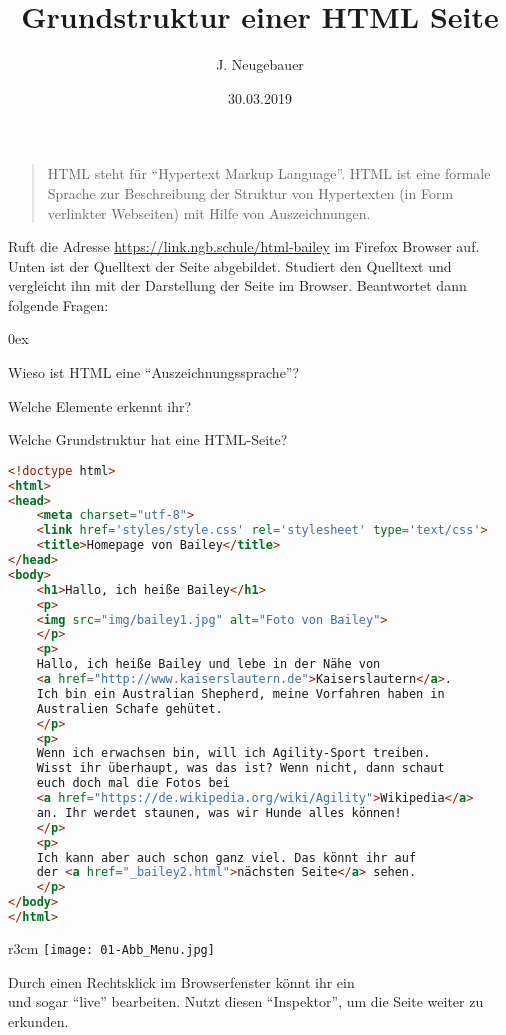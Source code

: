 \documentclass[a4paper,11pt]{scrartcl}
\author{J. Neugebauer}
\title{Grundstruktur einer HTML Seite}
\date{30.03.2019}
\begin{document}

\begin{quote}
HTML steht für \enquote{Hypertext Markup Language}. HTML ist eine formale Sprache zur Beschreibung der Struktur von Hypertexten (in Form verlinkter Webseiten) mit Hilfe von Auszeichnungen.
\end{quote}

\begin{aufgabe}[symbol=\Large\symLaptop]
Ruft die Adresse \url{https://link.ngb.schule/html-bailey} im Firefox Browser auf. Unten ist der Quelltext der Seite abgebildet. Studiert den Quelltext und vergleicht ihn mit der Darstellung der Seite im Browser. Beantwortet dann folgende Fragen:
\begin{enumeratea}\itemsep 0ex
	\item Wieso ist HTML eine \enquote{Auszeichnungssprache}?
	\item Welche Elemente erkennt ihr?
	\item Welche Grundstruktur hat eine HTML-Seite?
\end{enumeratea}
\begin{lstlisting}[language=HTML,basicstyle=\scriptsize\ttfamily]
<!doctype html>
<html>
<head>
	<meta charset="utf-8">
	<link href='styles/style.css' rel='stylesheet' type='text/css'>
	<title>Homepage von Bailey</title>
</head>
<body>
	<h1>Hallo, ich heiße Bailey</h1>
	<p>
	<img src="img/bailey1.jpg" alt="Foto von Bailey">
	</p>
	<p>
	Hallo, ich heiße Bailey und lebe in der Nähe von 
	<a href="http://www.kaiserslautern.de">Kaiserslautern</a>. 
	Ich bin ein Australian Shepherd, meine Vorfahren haben in 
	Australien Schafe gehütet.
	</p>
	<p>
	Wenn ich erwachsen bin, will ich Agility-Sport treiben. 
	Wisst ihr überhaupt, was das ist? Wenn nicht, dann schaut 
	euch doch mal die Fotos bei 
	<a href="https://de.wikipedia.org/wiki/Agility">Wikipedia</a> 
	an. Ihr werdet staunen, was wir Hunde alles können!
	</p>
	<p>
	Ich kann aber auch schon ganz viel. Das könnt ihr auf 
	der <a href="_bailey2.html">nächsten Seite</a> sehen.
	</p>
</body>
</html>
\end{lstlisting}
\end{aufgabe}

\begin{wrapfigure}{r}{3cm}
	\texttt{[image: 01-Abb\_Menu.jpg]}
\end{wrapfigure}
\begin{aufgabe}[symbol=\Large\symLaptop]
	Durch einen Rechtsklick im Browserfenster könnt ihr ein \\
	 und sogar \enquote{live} bearbeiten. Nutzt diesen \enquote{Inspektor}, um die Seite weiter zu \\
	 erkunden.
\end{aufgabe}
\end{document}
